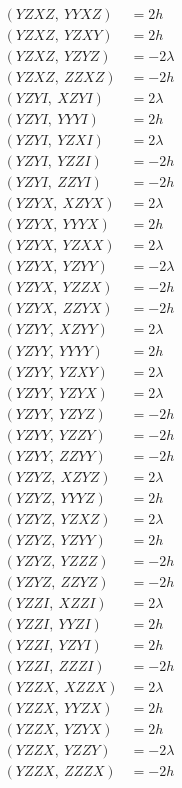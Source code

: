 \documentclass{article}
\begin{document}
\begin{align*}
  (YZXZ,\ YYXZ) &= 2 h \\
  (YZXZ,\ YZXY) &= 2 h \\
  (YZXZ,\ YZYZ) &= - 2 \lambda \\
  (YZXZ,\ ZZXZ) &= - 2 h \\
  (YZYI,\ XZYI) &= 2 \lambda \\
  (YZYI,\ YYYI) &= 2 h \\
  (YZYI,\ YZXI) &= 2 \lambda \\
  (YZYI,\ YZZI) &= - 2 h \\
  (YZYI,\ ZZYI) &= - 2 h \\
  (YZYX,\ XZYX) &= 2 \lambda \\
  (YZYX,\ YYYX) &= 2 h \\
  (YZYX,\ YZXX) &= 2 \lambda \\
  (YZYX,\ YZYY) &= - 2 \lambda \\
  (YZYX,\ YZZX) &= - 2 h \\
  (YZYX,\ ZZYX) &= - 2 h \\
  (YZYY,\ XZYY) &= 2 \lambda \\
  (YZYY,\ YYYY) &= 2 h \\
  (YZYY,\ YZXY) &= 2 \lambda \\
  (YZYY,\ YZYX) &= 2 \lambda \\
  (YZYY,\ YZYZ) &= - 2 h \\
  (YZYY,\ YZZY) &= - 2 h \\
  (YZYY,\ ZZYY) &= - 2 h \\
  (YZYZ,\ XZYZ) &= 2 \lambda \\
  (YZYZ,\ YYYZ) &= 2 h \\
  (YZYZ,\ YZXZ) &= 2 \lambda \\
  (YZYZ,\ YZYY) &= 2 h \\
  (YZYZ,\ YZZZ) &= - 2 h \\
  (YZYZ,\ ZZYZ) &= - 2 h \\
  (YZZI,\ XZZI) &= 2 \lambda \\
  (YZZI,\ YYZI) &= 2 h \\
  (YZZI,\ YZYI) &= 2 h \\
  (YZZI,\ ZZZI) &= - 2 h \\
  (YZZX,\ XZZX) &= 2 \lambda \\
  (YZZX,\ YYZX) &= 2 h \\
  (YZZX,\ YZYX) &= 2 h \\
  (YZZX,\ YZZY) &= - 2 \lambda \\
  (YZZX,\ ZZZX) &= - 2 h \\

\end{align*}
\end{document}
